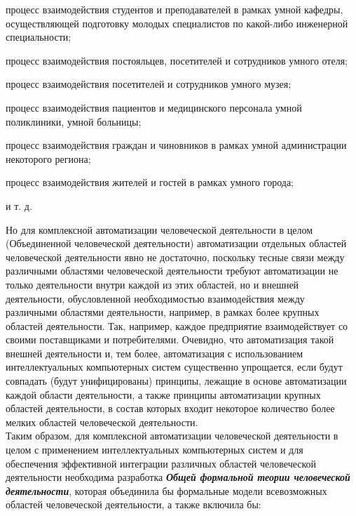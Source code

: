 \begin{scnsubstruct}
{\begin{scnitemize}
            \item процесс взаимодействия студентов и преподавателей в рамках умной кафедры, осуществляющей подготовку молодых специалистов по какой-либо инженерной специальности;
            \item процесс взаимодействия постояльцев, посетителей и сотрудников умного отеля;
            \item процесс взаимодействия посетителей и сотрудников умного музея;
            \item процесс взаимодействия пациентов и медицинского персонала умной поликлиники, умной больницы;
            \item процесс взаимодействия граждан и чиновников в рамках умной администрации некоторого региона;
            \item процесс взаимодействия жителей и гостей в рамках умного города;
            \item и т. д.
        \end{scnitemize}
        Но для комплексной автоматизации человеческой деятельности в целом (Объединенной человеческой деятельности) автоматизации отдельных областей человеческой деятельности явно не достаточно, поскольку тесные связи между различными областями человеческой деятельности требуют автоматизации не только деятельности внутри каждой из этих областей, но и внешней деятельности, обусловленной необходимостью взаимодействия между различными областями деятельности, например, в рамках более крупных областей деятельности. Так, например, каждое предприятие взаимодействует со своими поставщиками и потребителями. Очевидно, что автоматизация такой внешней деятельности и, тем более, автоматизация с использованием интеллектуальных компьютерных систем существенно упрощается, если будут совпадать (будут унифицированы) принципы, лежащие в основе автоматизации каждой области деятельности, а также принципы автоматизации крупных областей деятельности, в состав которых входит некоторое количество более мелких областей человеческой деятельности.\\
        Таким образом, для комплексной автоматизации человеческой деятельности в целом с применением интеллектуальных компьютерных систем и для обеспечения эффективной интеграции различных областей человеческой деятельности необходима разработка \textbf{\textit{Общей формальной теории человеческой деятельности}}, которая объединила бы формальные модели всевозможных областей человеческой деятельности, а также включила бы:
        \begin{scnitemize}

\end{scnitemize}}
\end{scnsubstruct}
